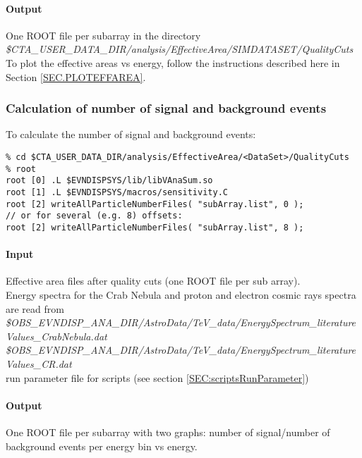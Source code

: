 \documentclass[titlepage,a4paper,twoside,11pt]{report}
\begin{document}
\paragraph{Output}

One ROOT file per subarray in the directory  \\
{\it \$CTA\_USER\_DATA\_DIR/analysis/EffectiveArea/SIMDATASET/QualityCuts} \\
To plot the effective areas vs energy, follow the instructions described here in Section \ref{SEC.PLOTEFFAREA}.

\subsubsection{Calculation of number of signal and background events}

To calculate the number of signal and background events:

\begin{lstlisting}
% cd $CTA_USER_DATA_DIR/analysis/EffectiveArea/<DataSet>/QualityCuts
% root 
root [0] .L $EVNDISPSYS/lib/libVAnaSum.so
root [1] .L $EVNDISPSYS/macros/sensitivity.C
root [2] writeAllParticleNumberFiles( "subArray.list", 0 );
// or for several (e.g. 8) offsets:
root [2] writeAllParticleNumberFiles( "subArray.list", 8 );
\end{lstlisting}

\paragraph{Input}
Effective area files after quality cuts (one ROOT file per sub array). \\
Energy spectra for the Crab Nebula and proton and electron cosmic rays spectra are read from \\
{\it \$OBS\_EVNDISP\_ANA\_DIR/AstroData/TeV\_data/EnergySpectrum\_literatureValues\_CrabNebula.dat} \\
{\it \$OBS\_EVNDISP\_ANA\_DIR/AstroData/TeV\_data/EnergySpectrum\_literatureValues\_CR.dat} \\
run parameter file for scripts (see section \ref{SEC:scriptsRunParameter})

\paragraph{Output}

One ROOT file per subarray with two graphs: number of signal/number of background events per energy bin vs energy.
\end{document}
